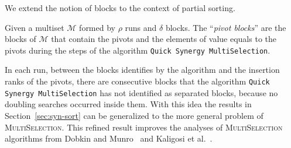We extend the notion of blocks to the context of partial sorting.
\begin{INUTILE}
  \begin{definition}
    Given a multiset $\mathcal{M}$ formed by $\rho$ runs and $\delta$
    blocks. The ``\emph{pivot blocks}'' are the blocks of
    $\mathcal{M}$ that contain the pivots and the elements of value
    equals to the pivots during the steps of the algorithm
    \texttt{Quick Synergy MultiSelection}.
  \end{definition}
\end{INUTILE}
In each run, between the blocks identifies by the algorithm and the
insertion ranks of the pivots, there are consecutive blocks that the
algorithm \texttt{Quick Synergy MultiSelection} has not identified as
separated blocks, because no doubling searches occurred inside them.
With this idea the results in Section~\ref{sec:syn-sort} can be
generalized to the more general problem of
\textsc{MultiSelection}. This refined result improves the analyses of
\textsc{MultiSelection} algorithms from Dobkin and
Munro~\cite{1981-JACM-OptimalTimeMinimalSpaceSelectionAlgorithms-DobkinMunro}
and Kaligosi et
al.~\cite{2005-ICALP-TowardsOptimalMultopleSelection-KaligosiMehlhornMunroSanders}.
 
